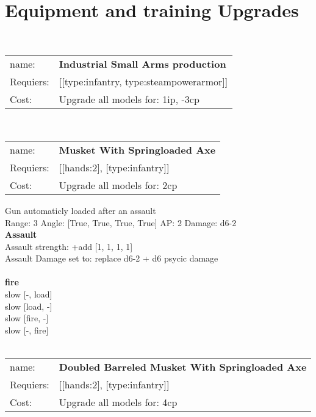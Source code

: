  
\ \\

\section{Equipment and training Upgrades}\ \\
\begin{tabular}{ll}
name: & {\bf Industrial Small Arms production } \\
Requiers: & [[type:infantry, type:steampowerarmor]] \\
Cost: & Upgrade all models for: 1ip, -3cp \\
\end{tabular}










\ \\
\begin{tabular}{ll}
name: & {\bf Musket With Springloaded Axe } \\
Requiers: & [[hands:2], [type:infantry]] \\
Cost: & Upgrade all models for: 2cp \\
\end{tabular}

Gun automaticly loaded after an assault\\ 


Range: 3  Angle: [True, True, True, True] AP: 2 Damage: d6-2 \\



{\bf Assault} \ \\
Assault strength: +add [1, 1, 1, 1] 
\\ 
Assault Damage set to: replace d6-2 + d6 psycic damage
\\ 



\ \\ {\bf fire } \\
slow [-, load] \\
slow [load, -] \\
slow [fire, -] \\
slow [-, fire] \\

\ \\
\begin{tabular}{ll}
name: & {\bf Doubled Barreled Musket With Springloaded Axe } \\
Requiers: & [[hands:2], [type:infantry]] \\
Cost: & Upgrade all models for: 4cp \\
\end{tabular}

